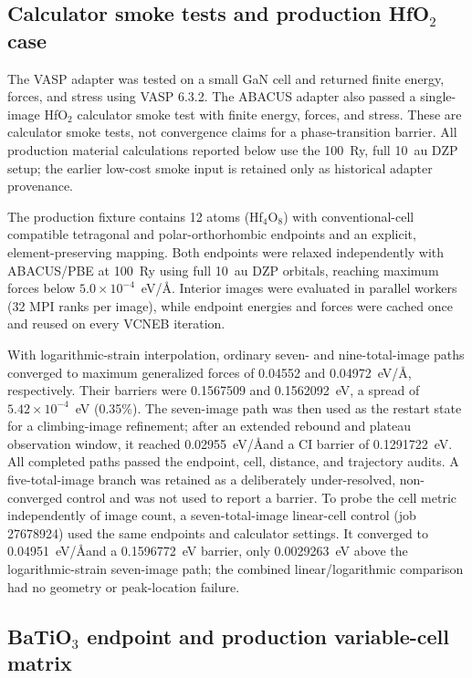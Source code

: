 \documentclass[final,3p,times]{elsarticle}
\begin{document}
\subsection{Calculator smoke tests and production HfO$_2$ case}

The VASP adapter was tested on a small GaN cell and returned finite energy,
forces, and stress using VASP 6.3.2.  The ABACUS adapter also passed a
single-image HfO$_2$ calculator smoke test with finite energy, forces, and
stress.  These are calculator smoke tests, not convergence claims for a
phase-transition barrier.  All production material calculations reported
below use the 100~Ry, full 10~au DZP setup; the earlier low-cost smoke input is
retained only as historical adapter provenance.

The production fixture contains 12 atoms (Hf$_4$O$_8$) with conventional-cell
compatible tetragonal and polar-orthorhombic endpoints and an explicit,
element-preserving mapping.  Both endpoints were relaxed independently with
ABACUS/PBE at 100~Ry using full 10~au DZP orbitals, reaching maximum forces
below $5.0\times10^{-4}$~eV/\AA.  Interior images were evaluated in parallel
workers (32 MPI ranks per image), while endpoint energies and forces were
cached once and reused on every VCNEB iteration.

With logarithmic-strain interpolation, ordinary seven- and nine-total-image
paths converged to maximum generalized forces of 0.04552 and 0.04972~eV/\AA,
respectively.  Their barriers were 0.1567509 and 0.1562092~eV, a spread of
$5.42\times10^{-4}$~eV (0.35\%).  The seven-image path was then used as the
restart state for a climbing-image refinement; after an extended rebound and
plateau observation window, it reached 0.02955~eV/\AA and a CI barrier of
0.1291722~eV.  All completed paths passed the endpoint, cell, distance, and
trajectory audits.  A five-total-image branch was retained as a deliberately
under-resolved, non-converged control and was not used to report a barrier.  To
probe the cell metric independently of image count, a seven-total-image
linear-cell control (job 27678924) used the same endpoints and calculator
settings.  It converged to 0.04951~eV/\AA and a 0.1596772~eV barrier, only
0.0029263~eV above the logarithmic-strain seven-image path; the combined
linear/logarithmic comparison had no geometry or peak-location failure.

\subsection{BaTiO$_3$ endpoint and production variable-cell matrix}
\end{document}
